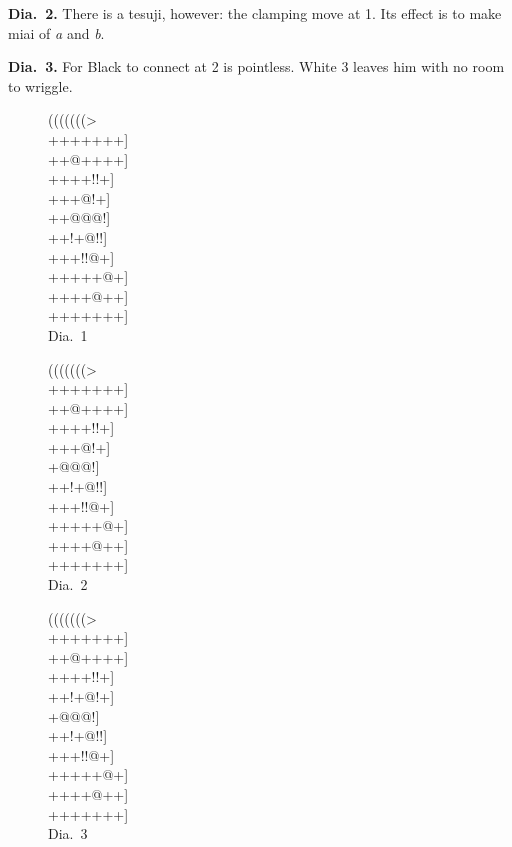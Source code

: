 \documentclass[mcrownvopaper,10pt,twopage,onecolumn,final]{memoir}
\begin{document}
\noindent
\textbf{Dia.\ 2.} There is a tesuji, however: the clamping move at 1. Its effect is
to make miai of \textit{a} and \textit{b}.

\noindent
\textbf{Dia.\ 3.} For Black to connect at 2 is pointless. White 3 leaves him with
no room to wriggle.
\begin{figure}[ht]
    \begin{minipage}[c]{0.33\linewidth}
        \centering    
        {\gnos%
        (((((((>\\
        +++++++]\\
        ++@++++]\\
        ++++!!+]\\
        +++@!+]\\
        ++@@@!]\\
        ++!+@!!]\\
        +++!!@+]\\
        +++++@+]\\
        ++++@++]\\
        +++++++]\\
        }
        Dia.\ 1
    \end{minipage}%
    \begin{minipage}[c]{0.34\linewidth}
        \centering    
        {\gnos%
        (((((((>\\
        +++++++]\\
        ++@++++]\\
        ++++!!+]\\
        ++{\gnosw{}}+@!+]\\
        +@@@!]\\
        ++!+@!!]\\
        +++!!@+]\\
        +++++@+]\\
        ++++@++]\\
        +++++++]\\
        }
        Dia.\ 2
    \end{minipage}%
    \begin{minipage}[c]{0.33\linewidth}
        \centering    
        {\gnos%
        (((((((>\\
        +++++++]\\
        ++@++++]\\
        ++++!!+]\\
        ++!+@!+]\\
        +{\gnosw{}}@{\gnosb{}}@@!]\\
        ++!+@!!]\\
        +++!!@+]\\
        +++++@+]\\
        ++++@++]\\
        +++++++]\\
        }
        Dia.\ 3
    \end{minipage}%
\end{figure}
\end{document}
